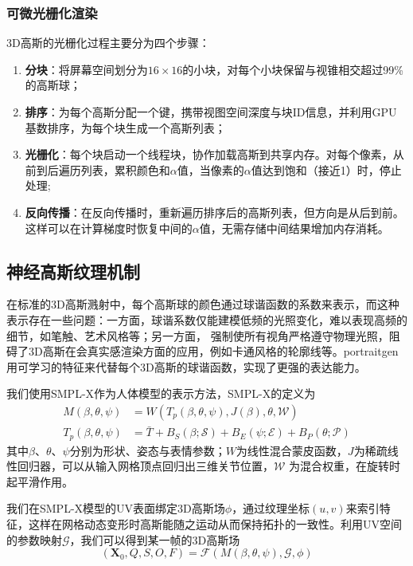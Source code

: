 \subsubsection{可微光栅化渲染}

3D高斯的光栅化过程主要分为四个步骤：
\begin{enumerate}
    \item \textbf{分块}：将屏幕空间划分为$16\times 16$的小块，对每个小块保留与视锥相交超过99\%的高斯球；
    \item \textbf{排序}：为每个高斯分配一个键，携带视图空间深度与块ID信息，并利用GPU基数排序，为每个块生成一个高斯列表；
    \item \textbf{光栅化}：每个块启动一个线程块，协作加载高斯到共享内存。对每个像素，从前到后遍历列表，累积颜色和$\alpha$值，当像素的$\alpha$值达到饱和（接近1）时，停止处理;
    \item \textbf{反向传播}：在反向传播时，重新遍历排序后的高斯列表，但方向是从后到前。这样可以在计算梯度时恢复中间的$\alpha$值，无需存储中间结果增加内存消耗。
\end{enumerate}

\subsection{神经高斯纹理机制}

在标准的3D高斯溅射中，每个高斯球的颜色通过球谐函数的系数来表示，而这种表示存在一些问题：一方面，球谐系数仅能建模低频的光照变化，难以表现高频的细节，如笔触、艺术风格等；另一方面，
强制使所有视角严格遵守物理光照，阻碍了3D高斯在会真实感渲染方面的应用，例如卡通风格的轮廓线等。portraitgen用可学习的特征来代替每个3D高斯的球谐函数，实现了更强的表达能力。

我们使用SMPL-X作为人体模型的表示方法，SMPL-X的定义为
\begin{align}
    M(\beta,\theta,\psi)&=W(T_p(\beta,\theta,\psi), J(\beta),\theta, \mathcal{W})\\
    T_p(\beta,\theta,\psi)&=\bar{T}+B_S(\beta;\mathcal{S})+B_E(\psi;\mathcal{E})+B_P(\theta;\mathcal{P})
\end{align}
其中$\beta$、$\theta$、$\psi$分别为形状、姿态与表情参数；$W$为线性混合蒙皮函数，$J$为稀疏线性回归器，可以从输入网格顶点回归出三维关节位置，$\mathcal{W}$
为混合权重，在旋转时起平滑作用。

我们在SMPL-X模型的UV表面绑定3D高斯场$\phi$，通过纹理坐标$(u,v)$来索引特征，这样在网格动态变形时高斯能随之运动从而保持拓扑的一致性。利用UV空间的参数映射$\mathcal{G}$，我们可以得到某一帧的3D高斯场
\begin{equation}
    (\symbf{X}_0,Q,S,O,F)=\mathcal{F}(M(\beta,\theta,\psi),\mathcal{G},\phi)
\end{equation}

